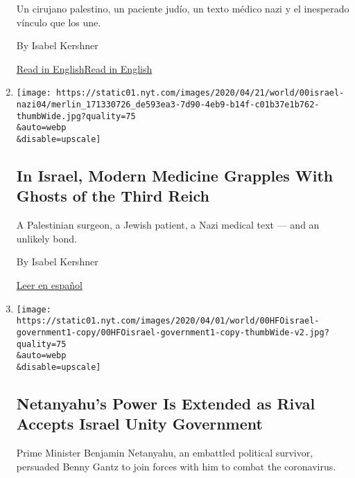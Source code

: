 \begin{enumerate}
  Un cirujano palestino, un paciente judío, un texto médico nazi y el
  inesperado vínculo que los une.

  By Isabel Kershner

  \href{https://www.nytimes.com/2020/05/12/world/middleeast/nazi-medical-text-israel.html}{Read
  in
  English}\href{https://www.nytimes.com/2020/05/12/world/middleeast/nazi-medical-text-israel.html}{Read
  in English}
\item
  \href{/2020/05/12/world/middleeast/nazi-medical-text-israel.html}{}

  \texttt{[image: https://static01.nyt.com/images/2020/04/21/world/00israel-nazi04/merlin\_171330726\_de593ea3-7d90-4eb9-b14f-c01b37e1b762-thumbWide.jpg?quality=75\\\&auto=webp\\\&disable=upscale]}

  \hypertarget{in-israel-modern-medicine-grapples-with-ghosts-of-the-third-reich}{%
  \subsection{In Israel, Modern Medicine Grapples With Ghosts of the
  Third
  Reich}\label{in-israel-modern-medicine-grapples-with-ghosts-of-the-third-reich}}

  A Palestinian surgeon, a Jewish patient, a Nazi medical text --- and
  an unlikely bond.

  By Isabel Kershner

  \href{https://www.nytimes.com/es/2020/05/15/espanol/mundo/libro-nazi-israel-medicina.html}{Leer
  en español}
\item
  \href{/2020/04/20/world/middleeast/netanyahu-israel-government-gantz.html}{}

  \texttt{[image: https://static01.nyt.com/images/2020/04/01/world/00HFOisrael-government1-copy/00HFOisrael-government1-copy-thumbWide-v2.jpg?quality=75\\\&auto=webp\\\&disable=upscale]}

  \hypertarget{netanyahus-power-is-extended-as-rival-accepts-israel-unity-government}{%
  \subsection{Netanyahu's Power Is Extended as Rival Accepts Israel
  Unity
  Government}\label{netanyahus-power-is-extended-as-rival-accepts-israel-unity-government}}

  Prime Minister Benjamin Netanyahu, an embattled political survivor,
  persuaded Benny Gantz to join forces with him to combat the
  coronavirus.


\end{enumerate}
